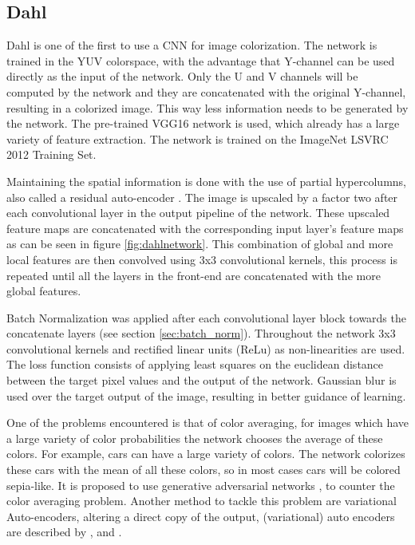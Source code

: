 \subsection{Dahl}

Dahl \cite{Dahl} is one of the first to use a CNN for image colorization. The network is trained in the YUV colorspace, with the advantage that Y-channel can be used directly as the input of the network. Only the U and V channels will be computed by the network and they are concatenated with the original Y-channel, resulting in a colorized image. This way less information needs to be generated by the network. 
The pre-trained VGG16 network is used, which already has a large variety of feature extraction. The network is trained on the ImageNet LSVRC 2012 Training Set. 

Maintaining the spatial information is done with the use of partial hypercolumns, also called a residual auto-encoder \cite{hariharan2015hypercolumns}. The image is upscaled by a factor two after each convolutional layer in the output pipeline of the network. These upscaled feature maps are concatenated with the corresponding input layer's feature maps as can be seen in figure \ref{fig:dahlnetwork}. This combination of global and more local features are then convolved using 3x3 convolutional kernels, this process is repeated until all the layers in the front-end are concatenated with the more global features. 

Batch Normalization was applied after each convolutional layer block towards the concatenate layers (see section \ref{sec:batch_norm}). Throughout the network 3x3 convolutional kernels and rectified linear units (ReLu) \cite{nair2010rectified} as non-linearities are used. The loss function consists of applying least squares on the euclidean distance between the target pixel values and the output of the network. Gaussian blur is used over the target output of the image, resulting in better guidance of learning. 

One of the problems encountered is that of color averaging, for images which have a large variety of color probabilities the network chooses the average of these colors. For example, cars can have a large variety of colors. The network colorizes these cars with the mean of all these colors, so in most cases cars will be colored sepia-like. It is proposed to use generative adversarial networks \cite{Radford}, to counter the color averaging problem. Another method to tackle this problem are variational Auto-encoders, altering a direct copy of the output, (variational) auto encoders are described by \cite{Gregor}, \cite{Kingma} and \cite{GoodfellowBOOK}. 


